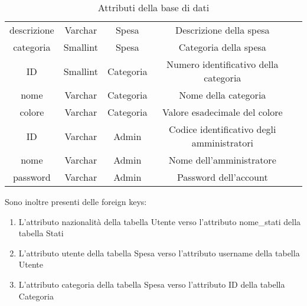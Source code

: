 \documentclass[binding=0.6cm, oneside, noexaminfo, italian]{sapthesis}
\begin{document}
\begin{table}[!ht]
\begin{tabularx}{\linewidth}{ccccX}
        descrizione & Varchar & Spesa & Descrizione della spesa \\
        categoria & Smallint & Spesa & Categoria della spesa \\
        ID & Smallint & Categoria & Numero identificativo della categoria \\
        nome & Varchar & Categoria & Nome della categoria \\
        colore & Varchar & Categoria & Valore esadecimale del colore \\
        ID & Varchar & Admin & Codice identificativo degli amministratori \\
        nome & Varchar & Admin & Nome dell'amministratore \\
        password & Varchar & Admin & Password dell'account \\
    \end{tabularx}
    \caption{Attributi della base di dati}
    \label{tab:attributi}
\end{table}
\newpage
Sono inoltre presenti delle foreign keys:
\begin{enumerate}
    \item L'attributo nazionalità della tabella Utente verso l'attributo nome\_stati della tabella Stati
    \item L'attributo utente della tabella Spesa verso l'attributo username della tabella Utente
    \item L'attributo categoria della tabella Spesa verso l'attributo ID della tabella Categoria
\end{enumerate}
\end{document}
